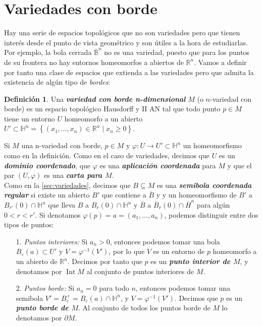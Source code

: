 \documentclass[10pt]{report}
\newcommand{\R}{\mathbb{R}}
\DeclareMathOperator{\interior}{Int} %
\newcommand{\enfatiza}[1]{\textbf{\textit{#1}}}
\theoremstyle{definition}
\newtheorem{defin}{Definición}[section]
\begin{document}
\section{Variedades con borde}\label{sec:borde}
Hay una serie de espacios topológicos que no son variedades pero que tienen interés desde el punto de vista geométrico y son útiles a la hora de estudiarlas. Por ejemplo, la bola cerrada $\overline{\mathbb{B}}^n$ no es una variedad, puesto que para los puntos de su frontera no hay entornos homeomorfos a abiertos de $\R^n$. Vamos a definir por tanto una clase de espacios que extienda a las variedades pero que admita la existencia de algún tipo de \textit{bordes}:
\begin{defin}
Una \enfatiza{variedad con borde n-dimensional} $M$ (o $n$-variedad con borde) es un espacio topológico  Hausdorff y II AN tal que todo punto $p\in M$ tiene un entorno $U$ homeomorfo a un abierto $U'\subset \mathbb{H}^n=
\left\{(x_1,\dots ,x_n)\in \R^n\mid x_n\geq 0\right\}$.
\end{defin}
Si $M$ una n-variedad con borde, $p\in M$ y $\varphi :U\to U'\subset \mathbb{H}^n$ un homeomorfismo como en la definición. Como en el caso de variedades, decimos que $U$ es un \enfatiza{dominio coordenado}, que $\varphi$ es una \enfatiza{aplicación coordenada} para $M$ y que el par $(U,\varphi )$ es una \enfatiza{carta para $M$}.\\
Como en la \autoref{sec:variedades}, decimos que $B\subseteq M$ es una \enfatiza{semibola coordenada regular} si existe un abierto $B'$ que contiene a $\overline{B}$ y y un homeomorfismo de $B'$ a $B_{r'}(0)\cap \mathbb{H}^n$ que lleva $B$ a $B_r(0)\cap \mathbb{H}^n$ y $\overline{B}$ a $\overline{B}_r(0)\cap \overline{H}^n$ para algún $0<r<r'$.
Si denotamos $\varphi (p)=a=(a_1,\dots ,a_n)$, podemos distinguir entre dos tipos de puntos:
\begin{itemize}

\item[1.] \textit{Puntos interiores:} Si $a_n>0$, entonces podemos tomar una bola $B_{\varepsilon}(a)\subset U'$ y $V=\varphi^{-1}(V')$, por lo que $V$ es un entorno de $p$ homeomorfo a un abierto de $\R^n$. Decimos por tanto que $p$ es un \enfatiza{punto interior de $M$}, y denotamos por $\interior{M}$ al conjunto de puntos interiores de $M$.
\item[2.] \textit{Puntos borde:} Si $a_n=0$ para todo $n$, entonces podemos tomar una semibola $V'=B_{\varepsilon}^{+}=B_{\varepsilon}(a)\cap \mathbb{H}^n$, y $V=\varphi^{-1}(V')$. Decimos que $p$ es un \enfatiza{punto borde de $M$}. Al conjunto de todos los puntos borde de $M$ lo denotamos por $\partial M$.
\end{itemize}
\end{document}
